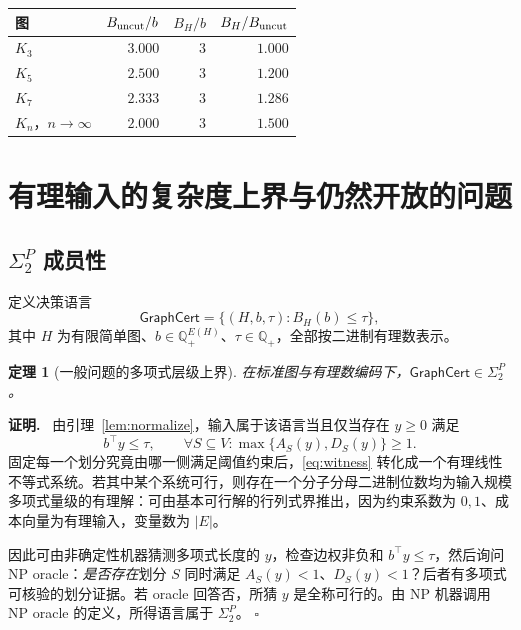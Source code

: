 \documentclass[11pt,a4paper]{ctexart}
\newtheorem{theorem}{定理}[section]
\theoremstyle{definition}
\newenvironment{proofcn}{\par\noindent\textbf{证明.}\ }{\hfill$\square$\par}
\newcommand{\GraphCert}{\mathsf{GraphCert}}
\newcommand{\1}{\boldsymbol 1}
\begin{document}
\begin{center}
\small
\begin{tabular}{@{}lrrr@{}}
\toprule
图 & $B_{\rm uncut}/b$ & $B_H/b$ & $B_H/B_{\rm uncut}$\\
\midrule
$K_3$ & $3.000$ & $3$ & $1.000$\\
$K_5$ & $2.500$ & $3$ & $1.200$\\
$K_7$ & $2.333$ & $3$ & $1.286$\\
$K_n$，$n\to\infty$ & $2.000$ & $3$ & $1.500$\\
\bottomrule
\end{tabular}
\end{center}

\section{有理输入的复杂度上界与仍然开放的问题}
\subsection{$\Sigma_2^P$ 成员性}
定义决策语言
\begin{equation}\label{eq:decision}
 \GraphCert=\{(H,b,\tau): B_H(b)\le\tau\},
\end{equation}
其中 $H$ 为有限简单图、$b\in\mathbb Q_+^{E(H)}$、$\tau\in\mathbb Q_+$，全部按二进制有理数表示。

\begin{theorem}[一般问题的多项式层级上界]\label{thm:sigma2}
在标准图与有理数编码下，$\GraphCert\in\Sigma_2^P$。
\end{theorem}
\begin{proofcn}
由引理~\ref{lem:normalize}，输入属于该语言当且仅当存在 $y\ge0$ 满足
\begin{equation}\label{eq:witness}
 b^\top y\le\tau,
 \qquad\forall S\subseteq V:
 \max\{A_S(y),D_S(y)\}\ge1.
\end{equation}
固定每一个划分究竟由哪一侧满足阈值约束后，\eqref{eq:witness} 转化成一个有理线性不等式系统。若其中某个系统可行，则存在一个分子分母二进制位数均为输入规模多项式量级的有理解：可由基本可行解的行列式界推出，因为约束系数为 $0,1$、成本向量为有理输入，变量数为 $|E|$。

因此可由非确定性机器猜测多项式长度的 $y$，检查边权非负和 $b^\top y\le\tau$，然后询问 NP oracle：\emph{是否存在}划分 $S$ 同时满足 $A_S(y)<1$、$D_S(y)<1$？后者有多项式可核验的划分证据。若 oracle 回答否，所猜 $y$ 是全称可行的。由 NP 机器调用 NP oracle 的定义，所得语言属于 $\Sigma_2^P$。
\end{proofcn}
\end{document}
